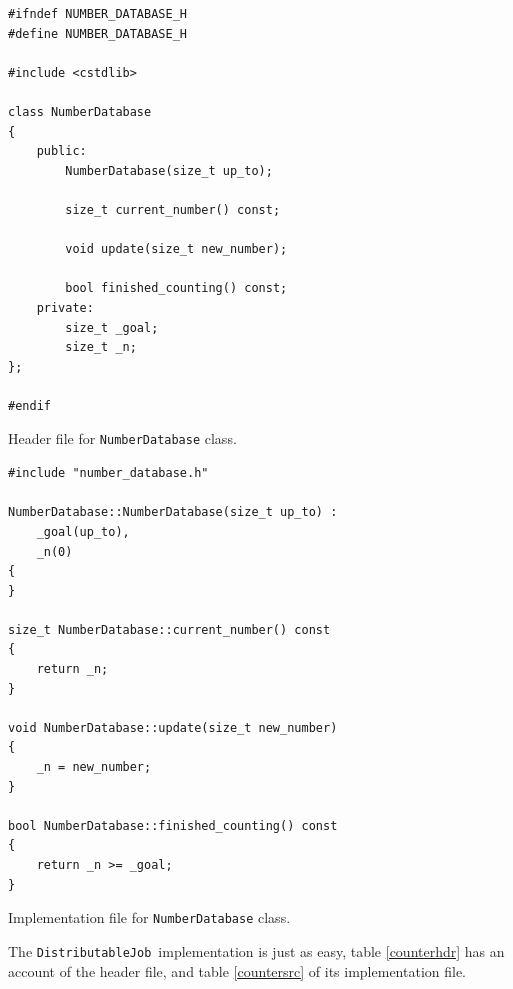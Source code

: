 \documentclass[a4paper,12pt,english]{report}
\renewcommand{\DJ}{\texttt{DistributableJob}}
\begin{document}
\begin{table}[!htb]
\lstset{language=C++}
\begin{lstlisting}[frame=single]
#ifndef NUMBER_DATABASE_H
#define NUMBER_DATABASE_H

#include <cstdlib>

class NumberDatabase
{
    public:
        NumberDatabase(size_t up_to);

        size_t current_number() const;

        void update(size_t new_number);

        bool finished_counting() const;
    private:
        size_t _goal;
        size_t _n;
};

#endif
\end{lstlisting}
\centering \caption{Header file for \texttt{NumberDatabase} class.} \label{dbheader}
\end{table}

\begin{table}[!htb]
\lstset{language=C++}
\begin{lstlisting}[frame=single]
#include "number_database.h"

NumberDatabase::NumberDatabase(size_t up_to) :
    _goal(up_to),
    _n(0)
{
}

size_t NumberDatabase::current_number() const
{
    return _n;
}

void NumberDatabase::update(size_t new_number)
{
    _n = new_number;
}

bool NumberDatabase::finished_counting() const
{
    return _n >= _goal;
}
\end{lstlisting}
\centering \caption{Implementation file for \texttt{NumberDatabase} class.} \label{dbimpl}
\end{table}

The \DJ \ implementation is just as easy, table \ref{counterhdr} has an account of the header file, and table \ref{countersrc} of its implementation file.
\end{document}
